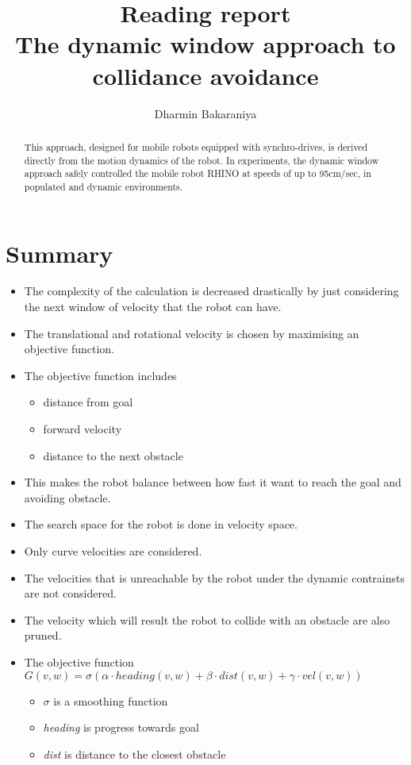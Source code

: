 \documentclass[12pt]{article}
\title{Reading report\\ The dynamic window approach to collidance avoidance}
\author{Dharmin Bakaraniya}
\begin{document}
\maketitle{}
\begin{abstract}
This approach, designed for mobile robots equipped with synchro-drives,
is derived directly from the motion dynamics of the robot. In experiments, the dynamic window approach safely controlled the mobile
robot RHINO at speeds of up to 95cm/sec, in populated and dynamic
environments.
\end{abstract}
\section{Summary}
\begin{itemize}
    \item The complexity of the calculation is decreased drastically by just considering the next window of velocity that the robot can have.
    \item The translational and rotational velocity is chosen by maximising an objective function.
    \item The objective function includes
    \begin{itemize}
        \item distance from goal
        \item forward velocity
        \item distance to the next obstacle
    \end{itemize}
    \item This makes the robot balance between how fast it want to reach the goal and avoiding obstacle.
    \item The search space for the robot is done in velocity space.
    \item Only curve velocities are considered.
    \item The velocities that is unreachable by the robot under the dynamic contrainsts are not considered.
    \item The velocity which will result the robot to collide with an obstacle are also pruned.
    \item The objective function $G(v,w)= \sigma(\alpha \cdot  heading(v,w) +\beta \cdot dist(v,w) + \gamma \cdot vel(v,w))$
    \begin{itemize}
            \item $\sigma$ is a smoothing function
            \item \textit{heading} is progress towards goal
            \item \textit{dist} is distance to the closest obstacle

\end{itemize}
\end{itemize}
\end{document}
